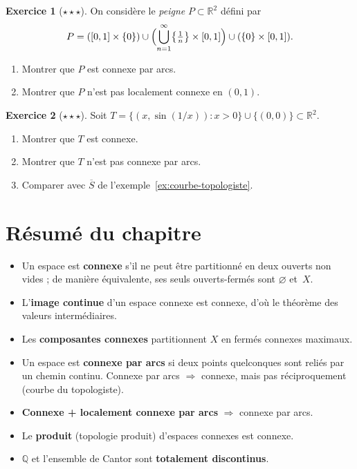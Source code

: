 \documentclass[12pt,a4paper,openany]{book}
\theoremstyle{definition}
\theoremstyle{cours}
\theoremstyle{coursnormal}
\newtheorem{exercice}{Exercice}[chapter]
\begin{document}
\begin{exercice}[$\star\star\star$]
\label{exo:peigne}
On considère le \emph{peigne} $P \subset \mathbb{R}^2$ défini par
\[
P = ([0,1] \times \{0\}) \cup \Bigl( \bigcup_{n=1}^{\infty} \bigl\{\tfrac{1}{n}\bigr\} \times [0,1] \Bigr) \cup (\{0\} \times [0,1]).
\]
\begin{enumerate}[label=(\alph*)]
  \item Montrer que $P$ est connexe par arcs.
  \item Montrer que $P$ n'est pas localement connexe en $(0,1)$.
\end{enumerate}
\end{exercice}

\begin{exercice}[$\star\star\star$]
\label{exo:topologiste-variante}
Soit $T = \{(x, \sin(1/x)) : x > 0\} \cup \{(0,0)\} \subset \mathbb{R}^2$.
\begin{enumerate}[label=(\alph*)]
  \item Montrer que $T$ est connexe.
  \item Montrer que $T$ n'est pas connexe par arcs.
  \item Comparer avec $\overline{S}$ de l'exemple~\ref{ex:courbe-topologiste}.
\end{enumerate}
\end{exercice}

\section*{Résumé du chapitre~\thechapter}

\begin{itemize}
  \item Un espace est \textbf{connexe} s'il ne peut être partitionné en deux ouverts
        non vides ; de manière équivalente, ses seuls ouverts-fermés sont
        $\varnothing$ et~$X$.
  \item L'\textbf{image continue} d'un espace connexe est connexe, d'où le
        théorème des valeurs intermédiaires.
  \item Les \textbf{composantes connexes} partitionnent $X$ en fermés connexes
        maximaux.
  \item Un espace est \textbf{connexe par arcs} si deux points quelconques sont
        reliés par un chemin continu. Connexe par arcs $\Rightarrow$ connexe, mais
        pas réciproquement (courbe du topologiste).
  \item \textbf{Connexe + localement connexe par arcs} $\Rightarrow$ connexe par arcs.
  \item Le \textbf{produit} (topologie produit) d'espaces connexes est connexe.
  \item $\mathbb{Q}$ et l'ensemble de Cantor sont \textbf{totalement discontinus}.
\end{itemize}
\end{document}
